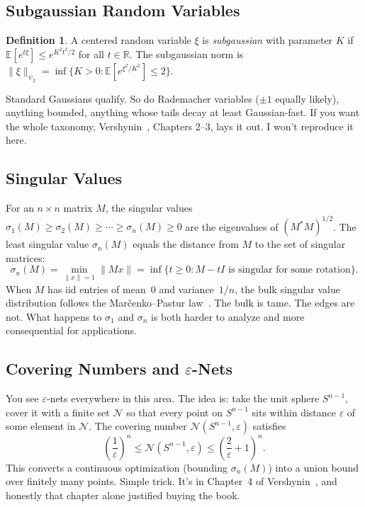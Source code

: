 \documentclass[11pt]{article}
\theoremstyle{definition}
\newtheorem{definition}[theorem]{Definition}
\theoremstyle{remark}
\newcommand{\R}{\mathbb{R}}
\newcommand{\E}{\mathbb{E}}
\begin{document}
\subsection{Subgaussian Random Variables}

\begin{definition}
A centered random variable $\xi$ is \emph{subgaussian} with parameter $K$ if
$\E[e^{t\xi}] \le e^{K^2 t^2 / 2}$ for all $t \in \R$. The subgaussian norm is
$\|\xi\|_{\psi_2} = \inf\{K > 0 : \E[e^{\xi^2/K^2}] \le 2\}$.
\end{definition}

Standard Gaussians qualify. So do Rademacher variables ($\pm 1$ equally likely), anything bounded, anything whose tails decay at least Gaussian-fast.
If you want the whole taxonomy, Vershynin~\cite{vershynin2018high}, Chapters 2--3, lays it out.
I won't reproduce it here.

\subsection{Singular Values}

For an $n \times n$ matrix $M$, the singular values $\sigma_1(M) \ge \sigma_2(M) \ge
\cdots \ge \sigma_n(M) \ge 0$ are the eigenvalues of $(M^* M)^{1/2}$. The least
singular value $\sigma_n(M)$ equals the distance from $M$ to the set of
singular matrices:
\[
  \sigma_n(M) = \min_{\|x\| = 1} \|Mx\| = \inf\{t \ge 0 : M - tI \text{ is singular for some rotation}\}.
\]
When $M$ has iid entries of mean~0 and variance~$1/n$, the bulk singular value distribution follows the Mar\v{c}enko--Pastur law~\cite{marchenko1967distribution}.
The bulk is tame. The edges are not. What happens to $\sigma_1$ and $\sigma_n$ is both harder to analyze and more consequential for applications.

\subsection{Covering Numbers and $\varepsilon$-Nets}

You see $\varepsilon$-nets everywhere in this area. The idea is: take the unit sphere $S^{n-1}$, cover it with a finite set $\mathcal{N}$ so that every point on $S^{n-1}$ sits within distance $\varepsilon$ of some element in $\mathcal{N}$.
The covering number $\mathcal{N}(S^{n-1}, \varepsilon)$ satisfies
\[
  \left(\frac{1}{\varepsilon}\right)^n \le \mathcal{N}(S^{n-1}, \varepsilon)
  \le \left(\frac{2}{\varepsilon} + 1\right)^n.
\]
This converts a continuous optimization (bounding $\sigma_n(M)$) into a union bound over finitely many points.
Simple trick.
It's in Chapter~4 of Vershynin~\cite{vershynin2018high}, and honestly that chapter alone justified buying the book.
\end{document}
